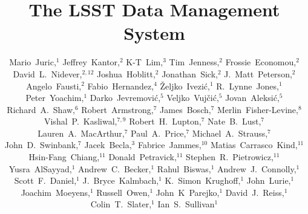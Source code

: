 \documentclass[11pt,twoside]{article}
\begin{document}
\title{The LSST Data Management System}
\author{
Mario~Juric,$^1$
Jeffrey~Kantor,$^2$
K-T~Lim,$^3$
Tim~Jenness,$^2$
Frossie~Economou,$^2$
David~L.~Nidever,$^{2,12}$
Joshua~Hoblitt,$^2$
Jonathan~Sick,$^2$
J.~Matt~Peterson,$^2$
Angelo~Fausti,$^2$
Fabio~Hernandez,$^4$
\v{Z}eljko~Ivezi\'{c},$^1$
R.~Lynne~Jones,$^1$
Peter~Yoachim,$^1$
Darko~Jevremovi\'c,$^5$
Veljko~Vuj\v ci\'c,$^5$
Jovan~Aleksi\'c,$^5$
Richard~A.~Shaw,$^6$
Robert~Armstrong,$^7$
James~Bosch,$^7$
Merlin~Fisher-Levine,$^8$
Vishal~P.~Kasliwal,$^{7,9}$
Robert~H.~Lupton,$^7$
Nate~B.~Lust,$^7$
Lauren~A.~MacArthur,$^7$
Paul~A.~Price,$^7$
Michael~A.~Strauss,$^7$
John~D.~Swinbank,$^7$
Jacek~Becla,$^3$
Fabrice~Jammes,$^{10}$
Matias~Carrasco~Kind,$^{11}$
Hsin-Fang~Chiang,$^{11}$
Donald~Petravick,$^{11}$
Stephen~R.~Pietrowicz,$^{11}$
Yusra~AlSayyad,$^1$
Andrew~C.~Becker,$^1$
Rahul~Biswas,$^1$
Andrew~J.~Connolly,$^1$
Scott~F.~Daniel,$^1$
J.~Bryce~Kalmbach,$^1$
K.~Simon~Krughoff,$^1$
John~Lurie,$^1$
Joachim~Moeyens,$^1$
Russell~Owen,$^1$
John~K~Parejko,$^1$
David~J.~Reiss,$^1$
Colin~T.~Slater,$^1$
Ian~S.~Sullivan$^1$
}
\end{document}
